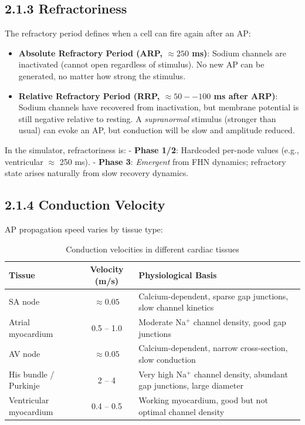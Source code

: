\documentclass[12pt,oneside,a4paper]{book}
\begin{document}
\subsection{2.1.3 Refractoriness}

The refractory period defines when a cell can fire again after an AP:

\begin{itemize}
  \item \textbf{Absolute Refractory Period (ARP, $\approx 250$ ms)}: Sodium channels are inactivated (cannot open regardless of stimulus). No new AP can be generated, no matter how strong the stimulus.
  
  \item \textbf{Relative Refractory Period (RRP, $\approx 50 -- 100$ ms after ARP)}: Sodium channels have recovered from inactivation, but membrane potential is still negative relative to resting. A \emph{supranormal} stimulus (stronger than usual) can evoke an AP, but conduction will be slow and amplitude reduced.
\end{itemize}

In the simulator, refractoriness is:
- \textbf{Phase 1/2}: Hardcoded per-node values (e.g., ventricular $\approx$ 250 ms).
- \textbf{Phase 3}: \emph{Emergent} from FHN dynamics; refractory state arises naturally from slow recovery dynamics.

\subsection{2.1.4 Conduction Velocity}

AP propagation speed varies by tissue type:

\begin{table}[H]
\centering
\begin{tabularx}{\textwidth}{|l|c|X|}
\hline
\textbf{Tissue} & \textbf{Velocity (m/s)} & \textbf{Physiological Basis} \\
\hline
SA node & $\approx 0.05$ & Calcium-dependent, sparse gap junctions, slow channel kinetics \\
Atrial myocardium & 0.5 -- 1.0 & Moderate Na$^+$ channel density, good gap junctions \\
AV node & $\approx 0.05$ & Calcium-dependent, narrow cross-section, slow conduction \\
His bundle / Purkinje & 2 -- 4 & Very high Na$^+$ channel density, abundant gap junctions, large diameter \\
Ventricular myocardium & 0.4 -- 0.5 & Working myocardium, good but not optimal channel density \\
\hline
\end{tabularx}
\caption{Conduction velocities in different cardiac tissues}
\label{tab:conduction_velocities}
\end{table}
\end{document}
